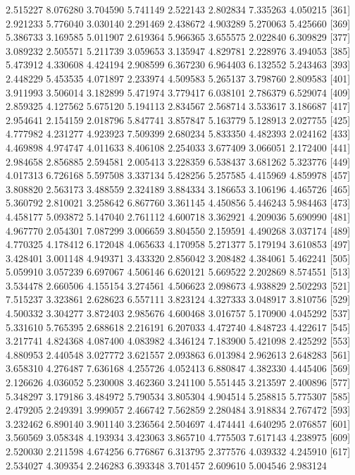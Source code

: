 \documentclass[12pt]{article}
\begin{document}
\begin{Schunk}
\begin{Soutput}
[353] 2.515227 8.076280 3.704590 5.741149 2.522143 2.802834 7.335263 4.050215
[361] 2.921233 5.776040 3.030140 2.291469 2.438672 4.903289 5.270063 5.425660
[369] 5.386733 3.169585 5.011907 2.619364 5.966365 3.655575 2.022840 6.309829
[377] 3.089232 2.505571 5.211739 3.059653 3.135947 4.829781 2.228976 3.494053
[385] 5.473912 4.330608 4.424194 2.908599 6.367230 6.964403 6.132552 5.243463
[393] 2.448229 5.453535 4.071897 2.233974 4.509583 5.265137 3.798760 2.809583
[401] 3.911993 3.506014 3.182899 5.471974 3.779417 6.038101 2.786379 6.529074
[409] 2.859325 4.127562 5.675120 5.194113 2.834567 2.568714 3.533617 3.186687
[417] 2.954641 2.154159 2.018796 5.847741 3.857847 5.163779 5.128913 2.027755
[425] 4.777982 4.231277 4.923923 7.509399 2.680234 5.833350 4.482393 2.024162
[433] 4.469898 4.974747 4.011633 8.406108 2.254033 3.677409 3.066051 2.172400
[441] 2.984658 2.856885 2.594581 2.005413 3.228359 6.538437 3.681262 5.323776
[449] 4.017313 6.726168 5.597508 3.337134 5.428256 5.257585 4.415969 4.859978
[457] 3.808820 2.563173 3.488559 2.324189 3.884334 3.186653 3.106196 4.465726
[465] 5.360792 2.810021 3.258642 6.867760 3.361145 4.450856 5.446243 5.984463
[473] 4.458177 5.093872 5.147040 2.761112 4.600718 3.362921 4.209036 5.690990
[481] 4.967770 2.054301 7.087299 3.006659 3.804550 2.159591 4.490268 3.037174
[489] 4.770325 4.178412 6.172048 4.065633 4.170958 5.271377 5.179194 3.610853
[497] 3.428401 3.001148 4.949371 3.433320 2.856042 3.208482 4.384061 5.462241
[505] 5.059910 3.057239 6.697067 4.506146 6.620121 5.669522 2.202869 8.574551
[513] 3.534478 2.660506 4.155154 3.274561 4.506623 2.098673 4.938829 2.502293
[521] 7.515237 3.323861 2.628623 6.557111 3.823124 4.327333 3.048917 3.810756
[529] 4.500332 3.304277 3.872403 2.985676 4.600468 3.016757 5.170900 4.045292
[537] 5.331610 5.765395 2.688618 2.216191 6.207033 4.472740 4.848723 4.422617
[545] 3.217741 4.824368 4.087400 4.083982 4.346124 7.183900 5.421098 2.425292
[553] 4.880953 2.440548 3.027772 3.621557 2.093863 6.013984 2.962613 2.648283
[561] 3.658310 4.276487 7.636168 4.255726 4.052413 6.880847 4.382330 4.445406
[569] 2.126626 4.036052 5.230008 3.462360 3.241100 5.551445 3.213597 2.400896
[577] 5.348297 3.179186 3.484972 5.790534 3.805304 4.904514 5.258815 5.775307
[585] 2.479205 2.249391 3.999057 2.466742 7.562859 2.280484 3.918834 2.767472
[593] 3.232462 6.890140 3.901140 3.236564 2.504697 4.474441 4.640295 2.076857
[601] 3.560569 3.058348 4.193934 3.423063 3.865710 4.775503 7.617143 4.238975
[609] 2.520030 2.211598 4.674256 6.776867 6.313795 2.377576 4.039332 4.245910
[617] 2.534027 4.309354 2.246283 6.393348 3.701457 2.609610 5.004546 2.983124

\end{Soutput}
\end{Schunk}
\end{document}
